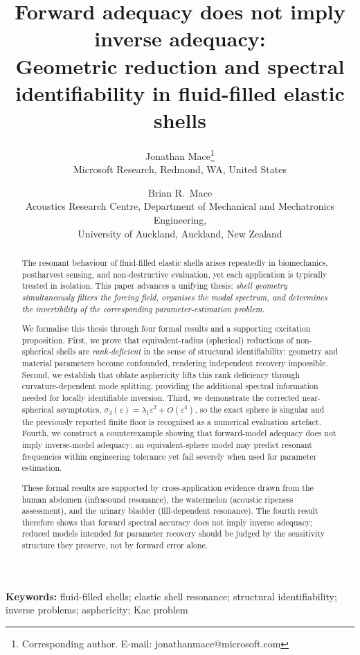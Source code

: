 \documentclass[12pt]{article}
\title{Forward adequacy does not imply inverse adequacy:\\
Geometric reduction and spectral identifiability in fluid-filled elastic shells}
\author{
  Jonathan Mace\thanks{Corresponding author. E-mail: jonathanmace@microsoft.com}\\
  \small Microsoft Research, Redmond, WA, United States
  \and
  Brian R.\ Mace\\
  \small Acoustics Research Centre, Department of Mechanical and
    Mechatronics Engineering,\\
  \small University of Auckland, Auckland, New Zealand
}
\date{}
\begin{document}

\maketitle

\begin{abstract}
The resonant behaviour of fluid-filled elastic shells arises
repeatedly in biomechanics, postharvest sensing, and non-destructive
evaluation, yet each application is typically treated in isolation.
This paper advances a unifying thesis: \emph{shell geometry simultaneously
filters the forcing field, organises the modal spectrum, and determines
the invertibility of the corresponding parameter-estimation problem.}

We formalise this thesis through four formal results and a supporting
excitation proposition.
First, we prove that equivalent-radius (spherical) reductions of
non-spherical shells are \emph{rank-deficient} in the sense of
structural identifiability: geometry and material parameters become
confounded, rendering independent recovery impossible.
Second, we establish that oblate asphericity lifts this rank deficiency through
curvature-dependent mode splitting, providing the additional spectral
information needed for locally identifiable inversion.
Third, we demonstrate the corrected near-spherical asymptotics,
\(\sigma_3(\varepsilon)=\lambda_1\varepsilon^2+O(\varepsilon^4)\), so the exact
sphere is singular and the previously reported finite floor is recognised as a
numerical evaluation artefact.
Fourth, we construct a counterexample showing that forward-model adequacy does not imply
inverse-model adequacy: an equivalent-sphere model may predict
resonant frequencies within engineering tolerance yet fail
severely when used for parameter estimation.

These formal results are supported by cross-application evidence drawn
from the human abdomen (infrasound resonance), the watermelon
(acoustic ripeness assessment), and the urinary bladder (fill-dependent
resonance).  The fourth result therefore shows that forward spectral
accuracy does not imply inverse adequacy; reduced models intended for
parameter recovery should be judged by the sensitivity structure they
preserve, not by forward error alone.
\end{abstract}

\bigskip
\noindent\textbf{Keywords:}
fluid-filled shells;
elastic shell resonance;
structural identifiability;
inverse problems;
asphericity;
Kac problem
\end{document}

